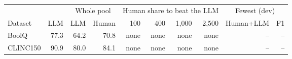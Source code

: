 \begin{tabular}{lrrrrrrrrr}
\toprule
 & & \multicolumn{2}{c}{Whole pool} & \multicolumn{4}{c}{Human share to beat the LLM} & \multicolumn{2}{c}{Fewest (dev)} \\
Dataset & LLM & LLM & Human & 100 & 400 & 1{,}000 & 2{,}500 & Human+LLM & F1 \\
\midrule
BoolQ & 77.3 & 64.2 & 70.8 & none & none & none & none & -- & -- \\
CLINC150 & 90.9 & 80.0 & 84.1 & none & none & none & none & -- & -- \\
\bottomrule
\end{tabular}

